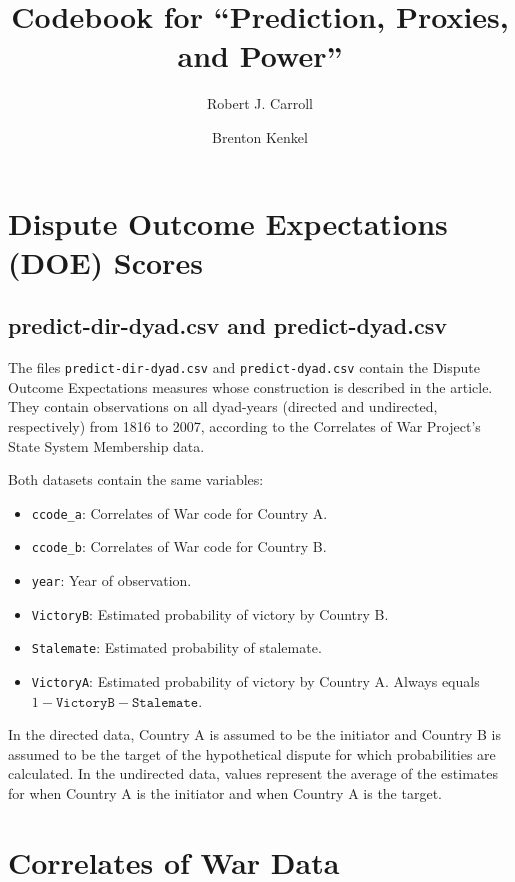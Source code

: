 \documentclass[12pt]{article}
\title{Codebook for ``Prediction, Proxies, and Power''}
\author{Robert J. Carroll \and Brenton Kenkel}
\begin{document}
\maketitle

\tableofcontents


\section{Dispute Outcome Expectations (DOE) Scores}

\subsection{predict-dir-dyad.csv and predict-dyad.csv}

The files \texttt{predict-dir-dyad.csv} and \texttt{predict-dyad.csv} contain the Dispute Outcome Expectations measures whose construction is described in the article.
They contain observations on all dyad-years (directed and undirected, respectively) from 1816 to 2007, according to the Correlates of War Project's State System Membership data.

Both datasets contain the same variables:
\begin{itemize}
  \item \texttt{ccode\_a}: Correlates of War code for Country A.
  \item \texttt{ccode\_b}: Correlates of War code for Country B.
  \item \texttt{year}: Year of observation.
  \item \texttt{VictoryB}: Estimated probability of victory by Country B.
  \item \texttt{Stalemate}: Estimated probability of stalemate.
  \item \texttt{VictoryA}: Estimated probability of victory by Country A.  Always equals $1 - \mathtt{VictoryB} - \mathtt{Stalemate}$.
\end{itemize}

In the directed data, Country A is assumed to be the initiator and Country B is assumed to be the target of the hypothetical dispute for which probabilities are calculated.
In the undirected data, values represent the average of the estimates for when Country A is the initiator and when Country A is the target.


\section{Correlates of War Data}
\end{document}
